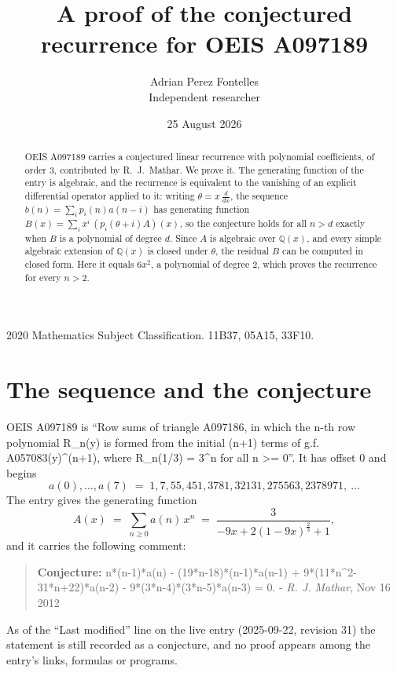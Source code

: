 \documentclass[11pt,a4paper]{article}
\title{A proof of the conjectured recurrence for OEIS A097189}
\author{Adrian Perez Fontelles\\ \small Independent researcher}
\date{25 August 2026}
\theoremstyle{plain}
\theoremstyle{definition}
\begin{document}
\maketitle

\begin{abstract}
OEIS A097189 carries a conjectured linear recurrence with polynomial coefficients, of
order 3, contributed by R.~J.~Mathar. We prove it. The generating function of the
entry is algebraic, and the recurrence is equivalent to the vanishing of an explicit
differential operator applied to it: writing $\theta=x\,\frac{d}{dx}$, the sequence
$b(n)=\sum_{i}p_{i}(n)a(n-i)$ has generating function
$B(x)=\sum_{i}x^{i}\,(p_{i}(\theta+i)A)(x)$, so the conjecture holds for all $n>d$ exactly
when $B$ is a polynomial of degree $d$. Since $A$ is algebraic over $\mathbb{Q}(x)$, and every simple
algebraic extension of $\mathbb{Q}(x)$ is closed under $\theta$, the residual $B$ can be
computed in closed form. Here it equals $6 x^{2}$, a polynomial of degree $2$, which proves
the recurrence for every $n>2$.
\end{abstract}

\noindent\small 2020 Mathematics Subject Classification. 11B37, 05A15, 33F10.\normalsize

\section{The sequence and the conjecture}

OEIS A097189 is ``Row sums of triangle A097186, in which the n-th row polynomial R\_n(y) is formed from the initial (n+1) terms of g.f. A057083(y)\textasciicircum{}(n+1), where R\_n(1/3) = 3\textasciicircum{}n for all n >= 0''. It has offset $0$ and begins
\[
a(0),\dots,a(7)\;=\;1, 7, 55, 451, 3781, 32131, 275563, 2378971,\ \dots
\]
The entry gives the generating function
\begin{equation}\label{eq:gf}
A(x)\;=\;\sum_{n\ge 0} a(n)\,x^{n}\;=\;\frac{3}{- 9 x + 2 \left(1 - 9 x\right)^{\frac{2}{3}} + 1} ,
\end{equation}
and it carries the following comment:
\begin{quote}\small
\textbf{Conjecture:} n*(n-1)*a(n) - (19*n-18)*(n-1)*a(n-1) + 9*(11*n\textasciicircum{}2-31*n+22)*a(n-2) - 9*(3*n-4)*(3*n-5)*a(n-3) = 0. - \emph{R. J. Mathar}, Nov 16 2012
\end{quote}
As of the ``Last modified'' line on the live entry (2025-09-22, revision 31) the
statement is still recorded as a conjecture, and no proof appears among the entry's links,
formulas or programs.
\end{document}
